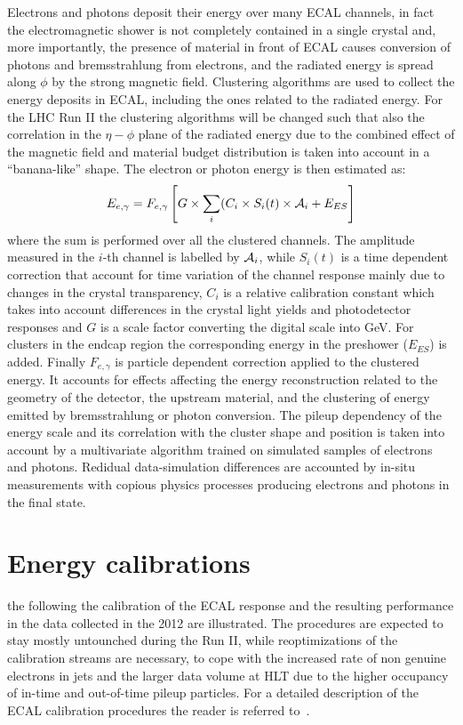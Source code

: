 \documentclass[journal]{IEEEtran}
\begin{document}
Electrons and photons deposit their energy over many ECAL channels, in fact the electromagnetic shower is not completely contained in a single crystal and, more importantly, the presence of material in front of ECAL causes conversion of photons and bremsstrahlung from electrons, and the radiated energy is spread along $\phi$ by the strong magnetic field. Clustering algorithms are used to collect the energy deposits in ECAL, including the ones related to the radiated energy. For the LHC Run II the clustering algorithms will be changed such that also the correlation in the $\eta-\phi$ plane of the radiated energy due to the combined effect of the magnetic field and material budget distribution is taken into account in a ``banana-like'' shape. The electron or photon energy is then estimated as:
\begin{equation}
\label{eqn:energy}
E_{e,\gamma} = F_{e,\gamma}\left[G \times \sum_i(C_i \times S_i(t) \times {\cal A}_i + E_{ES}\right]
\end{equation}
where the sum is performed over all the clustered channels. The amplitude measured in the $i$-th channel is labelled by ${\cal A}_i$, while $S_i(t)$ is a time dependent correction that account for time variation of the channel response mainly due to changes in the crystal transparency, $C_i$ is a relative calibration constant which takes into account differences in the crystal light yields and photodetector responses and $G$ is a scale factor converting the digital scale into GeV. For clusters in the endcap region the corresponding energy in the preshower ($E_{ES}$) is added. Finally $F_{e,\gamma}$ is particle dependent correction applied to the clustered energy. It accounts for effects affecting the energy reconstruction related to the geometry of the detector, the upstream material, and the clustering of energy emitted by bremsstrahlung or photon conversion. The pileup dependency of the energy scale and its correlation with the cluster shape and position is taken into account by a multivariate algorithm trained on simulated samples of electrons and photons.  Redidual data-simulation differences are accounted by in-situ measurements with copious physics processes producing electrons and photons in the final state.



\section{Energy calibrations}
\label{sec:energycalibration}
 the following the calibration of the ECAL response and the resulting performance in the data collected in the 2012 are illustrated. The procedures are expected to stay mostly untounched during the Run II, while reoptimizations of the calibration streams are necessary, to cope with the increased rate of non genuine electrons in jets and the larger data volume at HLT due to the higher occupancy of in-time and out-of-time pileup particles. For a detailed description of the ECAL calibration procedures the reader is referred to~\cite{Chatrchyan:2013dga}.
\end{document}
